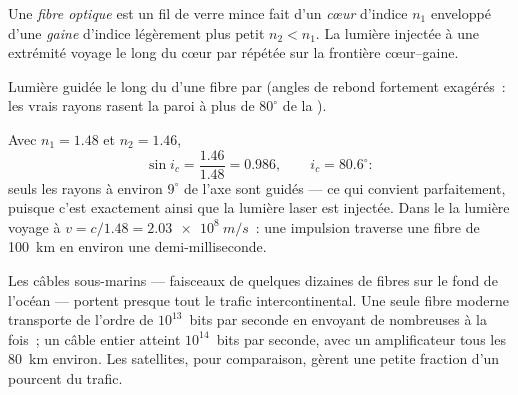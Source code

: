 \begin{definition}\label{def:g10:refraction:fiber}
Une \emph{fibre optique} est un fil de verre mince
fait d'un \emph{cœur} d'indice $n_1$
enveloppé d'une \emph{gaine} d'indice
légèrement plus petit $n_2 < n_1$. La lumière injectée à une extrémité
voyage le long du cœur par  répétée sur
la frontière cœur--gaine.
\end{definition}

\begin{omfigure}

{\small Lumière guidée le long du  d'une fibre par
 (angles de rebond fortement exagérés~:
les vrais rayons rasent la paroi à plus de $80^\circ$ de la
).}
\end{omfigure}

\begin{example}\label{ex:g10:refraction:fibernumbers}
Avec $n_1 = 1.48$ et $n_2 = 1.46$,
\[
\sin i_c = \frac{1.46}{1.48} = 0.986,
\qquad i_c = 80.6^\circ :
\]
seuls les rayons à environ $9^\circ$ de l'axe sont guidés --- ce qui
convient parfaitement, puisque c'est exactement ainsi que la lumière
laser est injectée. Dans le  la lumière voyage à
$v = c/1.48 = \qty{2.03e8}{m/s}$~: une impulsion traverse une fibre de
\qty{100}{km} en environ une demi-milliseconde.
\end{example}

\begin{remark}\label{rem:g10:refraction:datarates}
Les câbles sous-marins --- faisceaux de quelques dizaines de fibres sur
le fond de l'océan --- portent presque tout le trafic intercontinental.
Une seule fibre moderne transporte de l'ordre de $10^{13}$~bits par
seconde en envoyant de nombreuses  à la fois~; un
câble entier atteint $10^{14}$~bits par seconde, avec un amplificateur
tous les \qty{80}{km} environ. Les satellites, pour comparaison,
gèrent une petite fraction d'un pourcent du trafic.
\end{remark}

